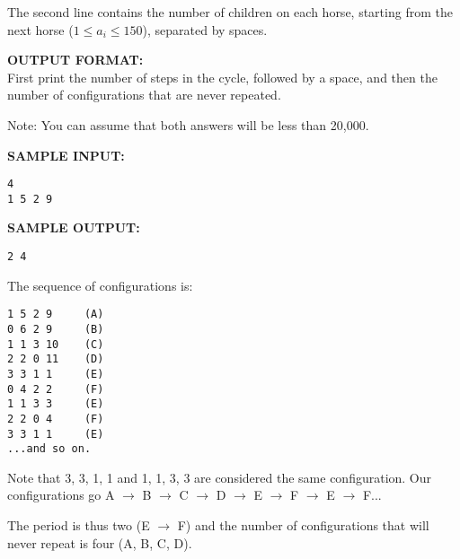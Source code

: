 \documentclass[twoside]{article}
\newcommand{\blank}{\vskip 3mm}
\begin{document}
The second line contains the number of children on each horse, starting from the next horse ($1 \leq a_i \leq 150$), separated by spaces.

\blank
\textbf{OUTPUT FORMAT:}\\
First print the number of steps in the cycle, followed by a space, and then the number of configurations that are never repeated.

Note: You can assume that both answers will be less than 20,000.

\blank
\textbf{SAMPLE INPUT:}
\begin{verbatim}
4
1 5 2 9
\end{verbatim}

\textbf{SAMPLE OUTPUT:}
\begin{verbatim}
2 4
\end{verbatim}

The sequence of configurations is:
\begin{verbatim}
1 5 2 9     (A)
0 6 2 9     (B)
1 1 3 10    (C)
2 2 0 11    (D)
3 3 1 1     (E)
0 4 2 2     (F)
1 1 3 3     (E)
2 2 0 4     (F)
3 3 1 1     (E)
...and so on.
\end{verbatim}
Note that 3, 3, 1, 1 and 1, 1, 3, 3 are considered the same configuration.
Our configurations go A $\rightarrow$ B $\rightarrow$ C $\rightarrow$ D $\rightarrow$ E $\rightarrow$ F $\rightarrow$ E $\rightarrow$ F...

The period is thus two (E $\rightarrow$ F) and the number of configurations that will never repeat is four (A, B, C, D).
\end{document}
